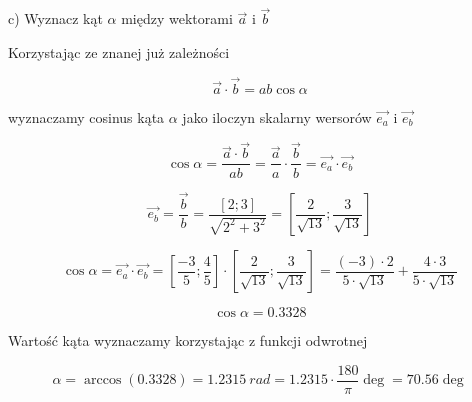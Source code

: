 c) Wyznacz kąt $\alpha$ między wektorami $\Vec{a}$ i $\Vec{b}$

Korzystając ze znanej już zależności

\[ \Vec{a} \cdot \Vec{b} = a b \cos\alpha \]

wyznaczamy cosinus kąta $\alpha$ jako iloczyn skalarny wersorów $\Vec{e_a}$ i $\Vec{e_b}$

\begin{equation}
    \cos\alpha = \frac{\Vec{a}\cdot\Vec{b}}{ab} = \frac{\Vec{a}}{a}\cdot\frac{\Vec{b}}{b} = \Vec{e_a}\cdot\Vec{e_b}
\end{equation}

\[ \Vec{e_b} = \frac{\Vec{b}}{b} = \frac{[2;3]}{\sqrt{2^2+3^2}} = \left[ \frac{2}{\sqrt{13}} ; \frac{3}{\sqrt{13}} \right] \]

\[ \cos\alpha = \Vec{e_a}\cdot\Vec{e_b} = \left[ \frac{-3}{5} ; \frac{4}{5} \right] \cdot \left[ \frac{2}{\sqrt{13}} ; \frac{3}{\sqrt{13}} \right] = \frac{(-3)\cdot 2}{5\cdot\sqrt{13}} + \frac{4 \cdot 3}{5 \cdot \sqrt{13}} \]

\[ \cos\alpha = 0.3328 \]

Wartość kąta wyznaczamy korzystając z funkcji odwrotnej

\[ \alpha = \arccos(0.3328) = \SI{1.2315}{rad} = 1.2315 \cdot \frac{180}{\pi} \deg = 70.56 \deg \]